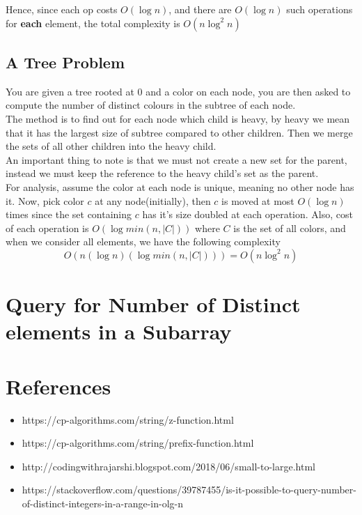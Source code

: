 \documentclass{article}
\begin{document}
    Hence, since each op costs $O(\log n)$, and there are $O(\log n)$
    such operations for \textbf{each} element, the total complexity is
    $O(n \log^2n)$

    \subsection{A Tree Problem}

    You are given a tree rooted at $0$ and a color on each node, you
    are then asked to compute the number of distinct colours in the
    subtree of each node. \\
    The method is to find out for each node which child is heavy,
    by heavy we mean that it has the largest size of subtree compared to
    other children. Then we merge the sets of all other children into
    the heavy child. \\
    An important thing to note is that we must not create a new set for the
    parent, instead we must keep the reference to the heavy child's set
    as the parent. \\
    For analysis, assume the color at each node is unique, meaning no other
    node has it. Now, pick color $c$ at any node(initially), then $c$ is moved
    at most $O(\log n)$ times since the set containing $c$ has it's size
    doubled at each operation. Also, cost of each operation is
    $O(\log {min(n, |C|)})$ where $C$ is the set of all colors, and when
    we consider all elements, we have the following complexity
    \[
        O(n (\log n) (\log{min(n, |C|)})) = O(n \log^2n)
    \]

    \section{Query for Number of Distinct elements in a Subarray}

    \section{References}

    \begin{itemize}
        \item https://cp-algorithms.com/string/z-function.html
        \item https://cp-algorithms.com/string/prefix-function.html
        \item http://codingwithrajarshi.blogspot.com/2018/06/small-to-large.html
        \item https://stackoverflow.com/questions/39787455/is-it-possible-to-query-number-of-distinct-integers-in-a-range-in-olg-n
    \end{itemize}
\end{document}
